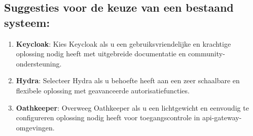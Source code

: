 \subsection{Suggesties voor de keuze van een bestaand systeem:}%
\label{subsec:suggesties-voor-de-keuze-van-een-bestaand-systeem}
\begin{enumerate}[label=\arabic*.]
    \item \textbf{Keycloak}: Kies Keycloak als u een gebruiksvriendelijke en krachtige oplossing nodig heeft met uitgebreide documentatie en community-ondersteuning.
    \item \textbf{Hydra}: Selecteer Hydra als u behoefte heeft aan een zeer schaalbare en flexibele oplossing met geavanceerde autorisatiefuncties.
    \item \textbf{Oathkeeper}: Overweeg Oathkeeper als u een lichtgewicht en eenvoudig te configureren oplossing nodig heeft voor toegangscontrole in \gls{api}-gateway-omgevingen.
\end{enumerate}